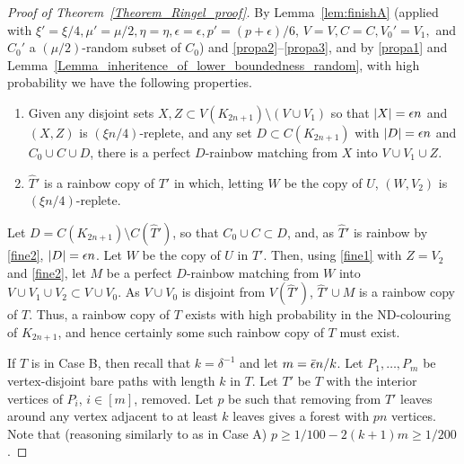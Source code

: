 \begin{proof}[Proof of Theorem~\ref{Theorem_Ringel_proof}]
 By Lemma~\ref{lem:finishA} (applied with $\xi'=\xi/4, \mu'=\mu/2, \eta=\eta, \epsilon=\epsilon, p'=(p+\epsilon)/6$, $V=V, C=C, V_0'=V_1,$ and $C_0'$ a $(\mu/2)$-random subset of $C_0$) 
 and \ref{propa2}--\ref{propa3}, and by \ref{propa1} and Lemma~\ref{Lemma_inheritence_of_lower_boundedness_random}, with high probability we have the following properties.
\begin{enumerate}[label = {\bfseries \Alph{propcounter}\arabic{enumi}}]
\item Given any disjoint sets $X,Z\subset V(K_{2n+1})\setminus (V\cup V_1)$ so that $|X|=\epsilon n$ and $(X,Z)$ is $(\xi n/4)$-replete, and any set $D\subset C(K_{2n+1})$ with $|D|=\epsilon n$ and $C_0\cup C\cup D$, there is a perfect $D$-rainbow matching from $X$ into $V\cup V_1\cup Z$.\label{fine1}
\item $\hat{T}'$ is a rainbow copy of $T'$ in which, letting $W$ be the copy of $U$, $(W,V_2)$ is $(\xi n/4)$-replete.\label{fine2}
\end{enumerate}
Let $D=C(K_{2n+1})\setminus C(\hat{T}')$, so that $C_0\cup C\subset D$, and, as $\hat{T}'$ is rainbow by \ref{fine2}, $|D|=\epsilon n$. Let $W$ be the copy of $U$ in $\hat{T}'$. Then, using \ref{fine1} with $Z=V_2$ and \ref{fine2}, let $M$ be a perfect $D$-rainbow matching from $W$ into $V\cup V_1\cup V_2\subset V\cup V_0$. As $V\cup V_0$ is disjoint from $V(\hat{T}')$, $\hat{T}'\cup M$ is a rainbow copy of $T$. Thus, a rainbow copy of $T$ exists with high probability in the ND-colouring of $K_{2n+1}$, and hence certainly some such rainbow copy of $T$ must exist.

If $T$ is in Case B, then recall that $k=\delta^{-1}$ and let $m=\bar{\epsilon} n/k$. Let $P_1,\ldots,P_m$ be vertex-disjoint bare paths with length $k$ in $T$. Let $T'$ be $T$ with the interior vertices of $P_i$, $i\in [m]$, removed.
 Let $p$ be such that removing from $T'$ leaves around any vertex adjacent to at least $k$ leaves gives a forest with $pn$ vertices. Note that (reasoning similarly to as in Case A) $p\geq 1/100-2(k+1)m\geq 1/200$.


\end{proof}

